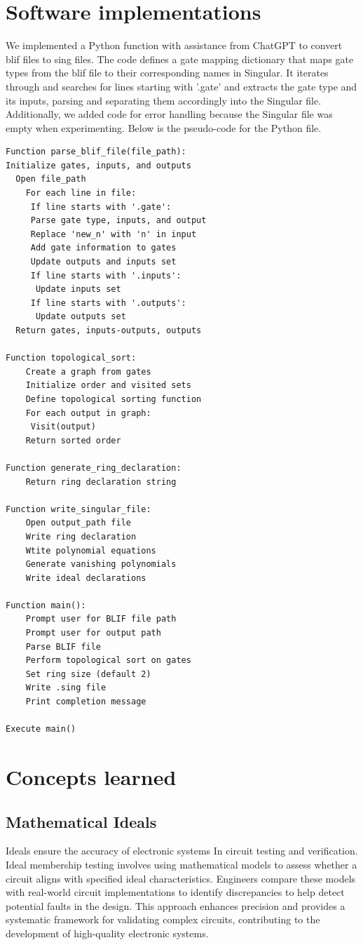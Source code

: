 \documentclass[conference]{IEEEtran}
\begin{document}
\section{Software implementations} %
We implemented a Python function with assistance from ChatGPT to convert blif files to sing files. The code defines a gate mapping dictionary that maps gate types 
from the blif file to their corresponding names in Singular. It iterates through and searches for lines starting with '.gate' and extracts the gate type and its 
inputs, parsing and separating them accordingly into the Singular file. Additionally, we added code for error handling because the Singular file was empty when 
experimenting. Below is the pseudo-code for the Python file. 
\begin{lstlisting}
Function parse_blif_file(file_path):
Initialize gates, inputs, and outputs
  Open file_path
    For each line in file:
     If line starts with '.gate':
     Parse gate type, inputs, and output
     Replace 'new_n' with 'n' in input
     Add gate information to gates
     Update outputs and inputs set
     If line starts with '.inputs':
      Update inputs set
     If line starts with '.outputs':
      Update outputs set
  Return gates, inputs-outputs, outputs
    
Function topological_sort:
    Create a graph from gates
    Initialize order and visited sets
    Define topological sorting function
    For each output in graph:
     Visit(output)
    Return sorted order
    
Function generate_ring_declaration:
    Return ring declaration string
    
Function write_singular_file:
    Open output_path file
    Write ring declaration 
    Wtite polynomial equations
    Generate vanishing polynomials
    Write ideal declarations
    
Function main():
    Prompt user for BLIF file path
    Prompt user for output path
    Parse BLIF file
    Perform topological sort on gates
    Set ring size (default 2)
    Write .sing file
    Print completion message
    
Execute main()
\end{lstlisting}

\section{Concepts learned}
\subsection{Mathematical Ideals}
Ideals ensure the accuracy of electronic systems In circuit testing and verification. 
Ideal membership testing involves using mathematical 
models to assess whether a circuit aligns with specified ideal characteristics. 
Engineers compare these models with real-world circuit implementations to identify 
discrepancies to help detect potential faults in the design. This approach enhances 
precision and provides a systematic framework for validating complex circuits, 
contributing to the development of high-quality electronic systems.
\end{document}
